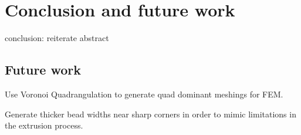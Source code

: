 \section{Conclusion and future work}
conclusion: reiterate abstract



\subsection{Future work}
Use Voronoi Quadrangulation to generate quad dominant meshings for FEM.

Generate thicker bead widths near sharp corners in order to mimic limitations in the extrusion process.

